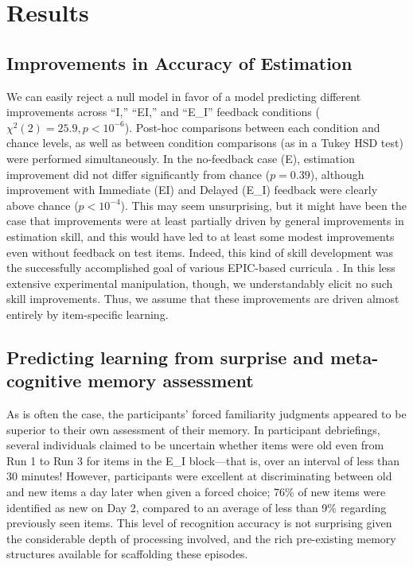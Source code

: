 \section{Results}

\subsection{Improvements in Accuracy of Estimation}

We can easily reject a null model in favor of a model predicting different
improvements across ``I,'' ``EI,'' and ``E\_I'' feedback conditions ($\chi^2(2)
= 25.9, p < 10^{-6}$). Post-hoc comparisons between each condition and chance
levels, as well as between condition comparisons (as in a Tukey HSD test) were
performed simultaneously. 
In the no-feedback case (E), estimation improvement
did not differ significantly from chance ($p = 0.39$), although improvement with
Immediate (EI) and Delayed (E\_I) feedback were clearly above chance ($p <
10^{-4}$). This may seem unsurprising, but it might have been the case that
improvements were at least partially driven by general improvements in
estimation skill, and this would have led to at least some modest improvements
even without feedback on test items. Indeed, this kind of skill development was
the successfully accomplished goal of various EPIC-based curricula
\cite[e.g.,][]{munnich_numerically-driven_2004,ranney_designing_2008}. In this
less extensive experimental manipulation, though, we understandably elicit no
such skill improvements. Thus, we assume that these improvements are driven
almost entirely by item-specific learning.

\subsection{Predicting learning from surprise and meta-cognitive memory
assessment}

As is often the case, the participants' forced familiarity judgments appeared to
be superior to their own assessment of their memory.  In participant
debriefings, several individuals claimed to be uncertain whether items were old
even from Run 1 to Run 3 for items in the E\_I block––that is, over an interval
of less than 30 minutes!  However, participants were excellent at discriminating
between old and new items a day later when given a forced choice; 76\% of new
items were identified as new on Day 2, compared to an average of less than 9\%
regarding previously seen items. This level of recognition accuracy is not
surprising given the considerable depth of processing involved, and the rich
pre-existing memory structures available for scaffolding these episodes.

